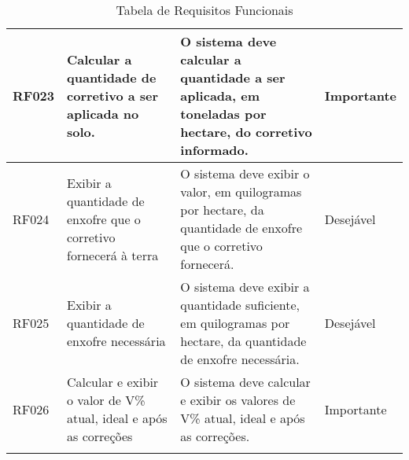 \begin{landscape}
\begin{longtable}{|p{1.5cm}|p{5cm}|p{9cm}|p{2.5cm}|}
    RF023 & Calcular a quantidade de corretivo a ser aplicada no solo.                       & O sistema deve calcular a quantidade a ser aplicada, em toneladas por hectare, do corretivo informado.                                                                                                                                                                                                  & Importante  \\\hline
    RF024 & Exibir a quantidade de enxofre que o corretivo fornecerá à terra                 & O sistema deve exibir o valor, em quilogramas por hectare, da quantidade de enxofre que o corretivo fornecerá.                                                                                                                                                                                          & Desejável  \\\hline
    RF025 & Exibir a quantidade de enxofre necessária                                        & O sistema deve exibir a quantidade suficiente, em quilogramas por hectare, da quantidade de enxofre necessária.                                                                                                                                                                                         & Desejável  \\\hline
    RF026 & Calcular e exibir o valor de V\% atual, ideal e após as correções                & O sistema deve calcular e exibir os valores de V\% atual, ideal e após as correções.                                                                                                                                                                                                                    & Importante  \\\hline
    \caption{Tabela de Requisitos Funcionais}
    \label{rf:tabela}
\end{longtable}
\end{landscape}
